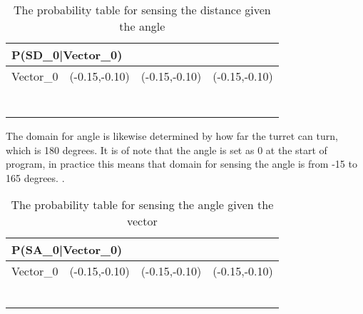 \begin{center}
\begin{table}[H]
\label{SDtable}
\begin{tabular}{|l|l|l|l|}
\hline
\multicolumn{4}{|l|}{P(SD\_0|Vector\_0)} \\ \hline
Vector\_0     & (-0.15,-0.10) & (-0.15,-0.10)    & (-0.15,-0.10)  \\\hline   
[0 - 75]      &     &     &     \\ \hline 
[76 - 100]    &     &     &     \\ \hline
[101 - 125]   &     &     &     \\ \hline
[126 - 150]   &     &     &     \\ \hline
[151 - 175]   &     &     &     \\ \hline
[176 - 200]   &     &     &     \\ \hline
[201 - 255]   &     &     &     \\ \hline
\end{tabular}
\caption{The probability table for sensing the distance given the angle}
\end{table}
\end{center}

The domain for angle is likewise determined by how far the turret can turn,
which is 180 degrees. It is of note that the angle is set as 0 at the start of
program, in practice this means that domain for sensing the angle is from -15 to
165 degrees. . 

\begin{center}
\begin{table}[H]
\label{SA_table}
\begin{tabular}{|l|l|l|l|}
\hline
\multicolumn{4}{|l|}{P(SA\_0|Vector\_0)} \\ \hline
Vector\_0     & (-0.15,-0.10) & (-0.15,-0.10)    & (-0.15,-0.10)  \\\hline   
[-15 - 15]      &     &     &     \\ \hline 
[16 - 45]    &     &     &     \\ \hline
[46 - 75]   &     &     &     \\ \hline
[76 - 105]   &     &     &     \\ \hline
[106 - 135]   &     &     &     \\ \hline
[136 - 165]   &     &     &     \\ \hline
\end{tabular}
\caption{The probability table for sensing the angle given the vector}
\end{table}
\end{center}

